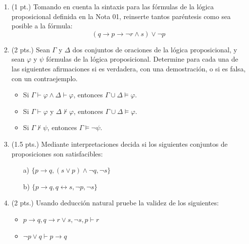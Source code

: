 \documentclass[11pt,letterpaper]{article}
\begin{document}
\begin{enumerate}
  \bigskip

  \item (1 pt.) Tomando en cuenta la sintaxis para las fórmulas de la lógica proposicional definida en la Nota 01, reinserte tantos paréntesis como sea posible a la fórmula:
    \[
    (q \rightarrow p \rightarrow \neg r \land s) \lor \neg p
    \]

  \bigskip

  \item (2 pts.) Sean $\Gamma$ y $\Delta$ dos conjuntos de oraciones de la lógica proposicional, y sean $\varphi$ y $\psi$ fórmulas de la lógica proposicional. Determine para cada una de las siguientes afirmaciones si es verdadera, con una demostración, o si es falsa, con un contraejemplo.

    \begin{itemize}
       \item Si $\Gamma \vdash \varphi \land \Delta \vdash \varphi$, entonces $\Gamma \cup \Delta \models \varphi$.
       \item Si $\Gamma \vdash \varphi$ y $\Delta \not\vdash \varphi$, entonces $\Gamma \cup \Delta \models \varphi$.
       \item Si $\Gamma \not\vdash \psi$, entonces $\Gamma \models \neg \psi$.
    \end{itemize}

  \bigskip

  \item (1.5 pts.) Mediante interpretaciones decida si los siguientes conjuntos de proposiciones son satisfacibles:

    \begin{itemize}
       \item[a)] $\{ p \rightarrow q, (s \lor p) \land \neg q, \neg s \}$
       \item[b)] $\{ p \rightarrow q, q \leftrightarrow s, \neg p, \neg s \}$
    \end{itemize}

  \bigskip

  \item (2 pts.) Usando deducción natural pruebe la validez de los siguientes:

    \begin{itemize}
       \item $p \rightarrow q, q \rightarrow r \lor s, \neg s, p \vdash r$
       \item $\neg p \lor q \vdash p \rightarrow q$
    \end{itemize}


\end{enumerate}
\end{document}
